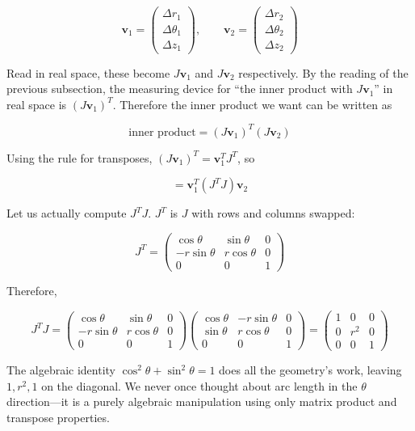 \documentclass[a4paper,12pt,openany]{book}
\begin{document}
\[\mathbf{v}_1 = \begin{pmatrix} \Delta r_1 \\ \Delta\theta_1 \\ \Delta z_1 \end{pmatrix},\qquad \mathbf{v}_2 = \begin{pmatrix} \Delta r_2 \\ \Delta\theta_2 \\ \Delta z_2 \end{pmatrix}\]

Read in real space, these become \(J\mathbf{v}_1\) and \(J\mathbf{v}_2\)
respectively. By the reading of the previous subsection, the measuring
device for ``the inner product with \(J\mathbf{v}_1\)'' in real space is
\((J\mathbf{v}_1)^T\). Therefore the inner product we want can be
written as

\[\text{inner product} = (J\mathbf{v}_1)^T (J\mathbf{v}_2)\]

Using the rule for transposes,
\((J\mathbf{v}_1)^T = \mathbf{v}_1^T J^T\), so

\[= \mathbf{v}_1^T (J^T J) \mathbf{v}_2\]

Let us actually compute \(J^T J\). \(J^T\) is \(J\) with rows and
columns swapped:

\[J^T = \begin{pmatrix}
\cos\theta & \sin\theta & 0 \\
-r\sin\theta & r\cos\theta & 0 \\
0 & 0 & 1
\end{pmatrix}\]

Therefore,

\[J^T J = \begin{pmatrix}
\cos\theta & \sin\theta & 0 \\
-r\sin\theta & r\cos\theta & 0 \\
0 & 0 & 1
\end{pmatrix}
\begin{pmatrix}
\cos\theta & -r\sin\theta & 0 \\
\sin\theta & r\cos\theta & 0 \\
0 & 0 & 1
\end{pmatrix}
= \begin{pmatrix}
1 & 0 & 0 \\
0 & r^2 & 0 \\
0 & 0 & 1
\end{pmatrix}\]

The algebraic identity \(\cos^2\theta + \sin^2\theta = 1\) does all the
geometry's work, leaving \(1, r^2, 1\) on the diagonal. We never once
thought about arc length in the \(\theta\) direction—it is a purely
algebraic manipulation using only matrix product and transpose
properties.
\end{document}
